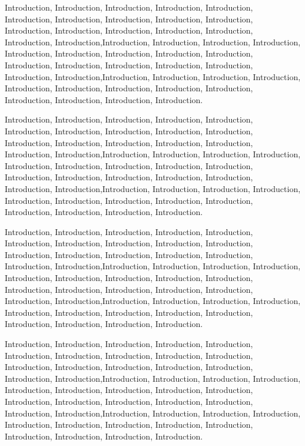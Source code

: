 Introduction, Introduction, Introduction, Introduction, Introduction, Introduction, Introduction, Introduction, Introduction, Introduction, Introduction, Introduction, Introduction, Introduction, Introduction, Introduction, Introduction,Introduction, Introduction, Introduction, Introduction, Introduction, Introduction, Introduction, Introduction, Introduction, Introduction, Introduction, Introduction, Introduction, Introduction, Introduction, Introduction,Introduction, Introduction, Introduction, Introduction, Introduction, Introduction, Introduction, Introduction, Introduction, Introduction, Introduction, Introduction, Introduction.

Introduction, Introduction, Introduction, Introduction, Introduction, Introduction, Introduction, Introduction, Introduction, Introduction, Introduction, Introduction, Introduction, Introduction, Introduction, Introduction, Introduction,Introduction, Introduction, Introduction, Introduction, Introduction, Introduction, Introduction, Introduction, Introduction, Introduction, Introduction, Introduction, Introduction, Introduction, Introduction, Introduction,Introduction, Introduction, Introduction, Introduction, Introduction, Introduction, Introduction, Introduction, Introduction, Introduction, Introduction, Introduction, Introduction.

Introduction, Introduction, Introduction, Introduction, Introduction, Introduction, Introduction, Introduction, Introduction, Introduction, Introduction, Introduction, Introduction, Introduction, Introduction, Introduction, Introduction,Introduction, Introduction, Introduction, Introduction, Introduction, Introduction, Introduction, Introduction, Introduction, Introduction, Introduction, Introduction, Introduction, Introduction, Introduction, Introduction,Introduction, Introduction, Introduction, Introduction, Introduction, Introduction, Introduction, Introduction, Introduction, Introduction, Introduction, Introduction, Introduction.

Introduction, Introduction, Introduction, Introduction, Introduction, Introduction, Introduction, Introduction, Introduction, Introduction, Introduction, Introduction, Introduction, Introduction, Introduction, Introduction, Introduction,Introduction, Introduction, Introduction, Introduction, Introduction, Introduction, Introduction, Introduction, Introduction, Introduction, Introduction, Introduction, Introduction, Introduction, Introduction, Introduction,Introduction, Introduction, Introduction, Introduction, Introduction, Introduction, Introduction, Introduction, Introduction, Introduction, Introduction, Introduction, Introduction.

